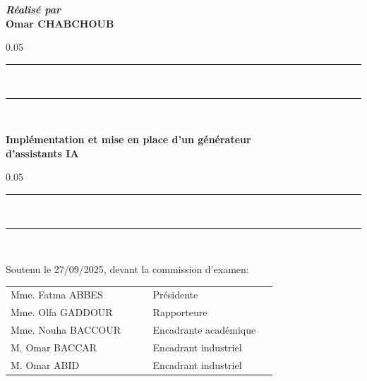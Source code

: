 \begin{titlepage}
\begin{center}
\vspace{30pt}
\textbf{\textit{Réalisé par}}\\
\vspace{10pt} {%
  \fontsize{18pt}{18pt}\selectfont%
  \textbf{Omar CHABCHOUB}\\
}%

\vspace{20pt} {%
  \begin{spacing}{0.05}
    \rule{200pt}{2pt}\\
    \rule{200pt}{0.75pt}\\
  \end{spacing}
  \renewcommand*{\familydefault}{\defaultFont}
  \fontsize{17pt}{17pt}\selectfont%
  \vspace{20pt}
  \textbf{
  Implémentation et mise en place d’un générateur \\ d'assistants IA\\%
  }
  \vspace{10pt}
  \begin{spacing}{0.05}
    \rule{200pt}{0.75pt}\\
    \rule{200pt}{2pt}\\
  \end{spacing}
}

\vspace{40pt}
Soutenu le 27/09/2025, devant la commission d'examen:\\
\vspace{20pt}
\begin{tabular}{p{0.35\linewidth} p{0.05\linewidth} p{0.35\linewidth}}
  Mme. Fatma ABBES & & Présidente \\
  Mme. Olfa GADDOUR & & Rapporteure\\
  Mme. Nouha BACCOUR & & Encadrante académique\\
  M. Omar BACCAR & & Encadrant industriel\\
  M. Omar ABID & & Encadrant industriel\\
\end{tabular}


\vfill

\end{center}
\end{titlepage}